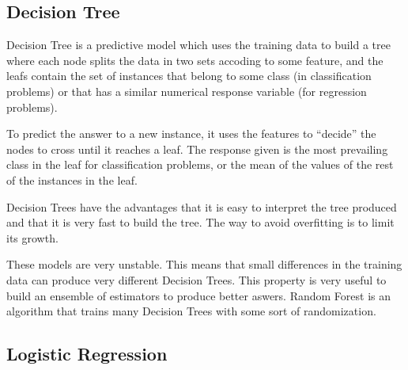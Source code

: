   \subsection{Decision Tree}
  \begin{pre-delivery}
    Decision Tree is a predictive model which uses the training data to build
    a tree where each node splits the data in two sets accoding to some
    feature, and the leafs contain the set of instances that belong to some class
    (in classification problems) or that has a similar numerical response variable
    (for regression problems).

    To predict the answer to a new instance, it uses the features to ``decide''
    the nodes to cross until it reaches a leaf. The response given is the
    most prevailing class in the leaf for classification problems, or the mean
    of the values of the rest of the instances in the leaf.

    Decision Trees have the advantages that it is easy to interpret the
    tree produced and that it is very fast to build the tree. The way to avoid
    overfitting is to limit its growth.

    These models are very unstable. This means that small differences in the
    training data can produce very different Decision Trees. This property
    is very useful to build an ensemble of estimators to produce better aswers.
    Random Forest is an algorithm that trains many Decision Trees with some sort
    of randomization.
  \end{pre-delivery}
  \subsection{Logistic Regression}

